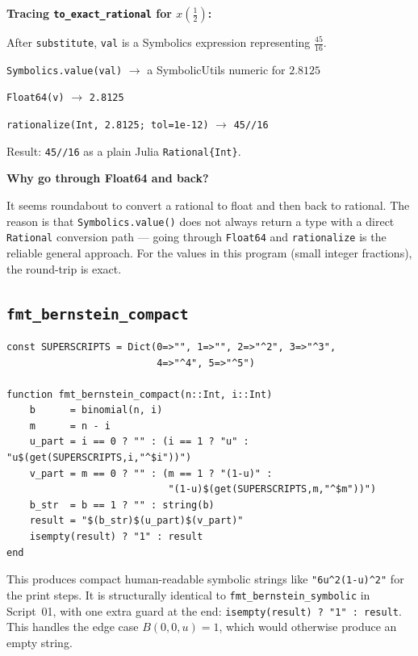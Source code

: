 \documentclass[12pt, a4paper]{article}
\newcommand{\cd}[1]{\texttt{#1}}
\begin{document}
\begin{examplebox}
\textbf{Tracing \cd{to\_exact\_rational} for $x\!\left(\tfrac{1}{2}\right)$:}

\medskip
After \cd{substitute}, \cd{val} is a Symbolics expression
representing $\tfrac{45}{16}$.

\cd{Symbolics.value(val)} $\to$ a SymbolicUtils numeric for $2.8125$

\cd{Float64(v)} $\to$ \cd{2.8125}

\cd{rationalize(Int, 2.8125; tol=1e-12)} $\to$ \cd{45//16}

Result: \cd{45//16} as a plain Julia \cd{Rational\{Int\}}.
\end{examplebox}

\begin{notebox}
\textbf{Why go through Float64 and back?}

It seems roundabout to convert a rational to float and then
back to rational.
The reason is that \cd{Symbolics.value()} does not always
return a type with a direct \cd{Rational} conversion path ---
going through \cd{Float64} and \cd{rationalize} is the
reliable general approach.
For the values in this program (small integer fractions),
the round-trip is exact.
\end{notebox}

\subsection{\texttt{fmt\_bernstein\_compact}}

\begin{verbatim}
const SUPERSCRIPTS = Dict(0=>"", 1=>"", 2=>"^2", 3=>"^3",
                          4=>"^4", 5=>"^5")

function fmt_bernstein_compact(n::Int, i::Int)
    b      = binomial(n, i)
    m      = n - i
    u_part = i == 0 ? "" : (i == 1 ? "u" : "u$(get(SUPERSCRIPTS,i,"^$i"))")
    v_part = m == 0 ? "" : (m == 1 ? "(1-u)" :
                            "(1-u)$(get(SUPERSCRIPTS,m,"^$m"))")
    b_str  = b == 1 ? "" : string(b)
    result = "$(b_str)$(u_part)$(v_part)"
    isempty(result) ? "1" : result
end
\end{verbatim}

This produces compact human-readable symbolic strings like
\cd{"6u\^{}2(1-u)\^{}2"} for the print steps.
It is structurally identical to \cd{fmt\_bernstein\_symbolic}
in Script~01, with one extra guard at the end:
\cd{isempty(result) ? "1" : result}.
This handles the edge case $B(0,0,u) = 1$, which would
otherwise produce an empty string.
\end{document}
